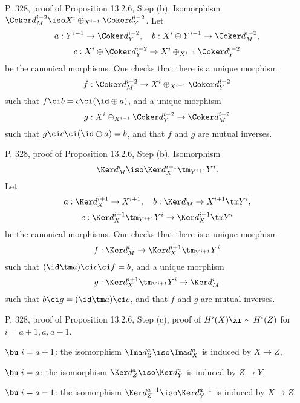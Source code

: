 \documentclass[12pt]{article}
\theoremstyle{remark}
\theoremstyle{definition}
\begin{document}
%

\begin{s}
P. 328, proof of Proposition 13.2.6, Step (b), Isomorphism $\Coker d_M^{i-2}\iso X^i\oplus_{X^{i-1}}\Coker d_Y^{i-2}$. Let 
$$
a:Y^{i-1}\to\Coker d_Y^{i-2},\quad b:X^i\oplus Y^{i-1}\to\Coker d_M^{i-2},
$$
$$
c:X^i\oplus\Coker d_Y^{i-2}\to X^i\oplus_{X^{i-1}}\Coker d_Y^{i-2}
$$
be the canonical morphisms. One checks that there is a unique morphism 
$$
f:\Coker d_M^{i-2}\to X^i\oplus_{X^{i-1}}\Coker d_Y^{i-2}
$$
such that $f\ci b=c\ci(\id\oplus a)$, and a unique morphism 
$$
g:X^i\oplus_{X^{i-1}}\Coker d_Y^{i-2}\to\Coker d_M^{i-2}
$$
such that $g\ci c\ci(\id\oplus a)=b$, and that $f$ and $g$ are mutual inverses.
\end{s}

%

\begin{s}
P. 328, proof of Proposition 13.2.6, Step (b), Isomorphism $$\Ker d_M^i\iso\Ker d_X^{i+1}\tm_{Y^{i+1}}Y^i.$$ Let 
$$
a:\Ker d_X^{i+1}\to X^{i+1},\quad b:\Ker d_M^i\to X^{i+1}\tm Y^i,
$$
$$
c:\Ker d_X^{i+1}\tm_{Y^{i+1}}Y^i\to\Ker d_X^{i+1}\tm Y^i
$$
be the canonical morphisms. One checks that there is a unique morphism 
$$
f:\Ker d_M^i\to\Ker d_X^{i+1}\tm_{Y^{i+1}}Y^i
$$
such that $(\id\tm a)\ci c\ci f=b$, and a unique morphism 
$$
g:\Ker d_X^{i+1}\tm_{Y^{i+1}}Y^i\to\Ker d_M^i
$$
such that $b\ci g=(\id\tm a)\ci c$, and that $f$ and $g$ are mutual inverses.
\end{s}

%

\begin{s}
P. 328, proof of Proposition 13.2.6, Step (c), proof of $H^i(X)\xr\sim H^i(Z)$ for $i=a+1,a,a-1$. 

\nn$\bu\ i=a+1$: the isomorphism $\Ima d_Z^a\iso\Ima d_X^a$ is induced by $X\to Z$,

\nn$\bu\ i=a$: the isomorphism $\Ker d_Z^a\iso\Ker d_Y^a$ is induced by $Z\to Y$,

\nn$\bu\ i=a-1$: the isomorphism $\Ker d_Z^{a-1}\iso\Ker d_Y^{a-1}$ is induced by $X\to Z$.
\end{s}


%
\end{document}
